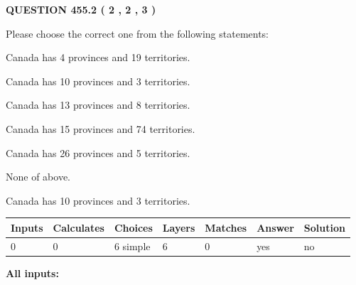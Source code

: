 \documentclass[12pt]{article}
\begin{document}
   
  
\vspace{0.2in}
  
{\textbf{\Large{QUESTION
455.2 
 ( 2 , 2 , 3 )
}}}
  
  
Please choose the correct one from the following statements:
 
 
Canada has   4 provinces and  19 territories.
 
 
Canada has 10  provinces and 3 territories.
 
 
Canada has  13 provinces and  8 territories.
 
 
Canada has  15 provinces and  74 territories.
 
 
Canada has  26 provinces and  5 territories.
 
 
 None of above.
 
 
\noindent{}
 
 
Canada has 10  provinces and 3 territories.
 
 
\noindent{}
 
 
   
   
   
   
\noindent\begin{tabular}{|l|l|l|l|l|l|l|}
 \hline
Inputs & Calculates & Choices & Layers & Matches & Answer & Solution \\ \hline
 0  & 
 0  & 
 6
  simple  
  & 
 6  & 
 0  & 
  yes & 
  no 
  \\ \hline
 \end{tabular}
   
   
   
   
\noindent{}
   
   
   
   
\noindent\vspace{0.1in}\hspace{-0.08in} {\textbf{\Large{All inputs: }}}
   
   
   
   
   
   
 \vspace{0.2in}
 
\end{document}
